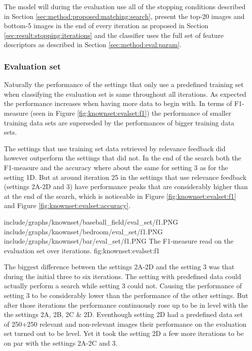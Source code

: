 The model will during the evaluation use all of the stopping conditions described in Section \ref{sec:method:proposed:matching:search}, present the top-20 images and bottom-5 images in the end of every iteration as proposed in Section \ref{sec:result:stopping:iterations} and the classifier uses the full set of feature descriptors as described in Section \ref{sec:method:eval:param}. 

\subsubsection{Evaluation set}
\label{sec:res:knownset:eval}
Naturally the performance of the settings that only use a predefined training set when classifying the evaluation set is same throughout all iterations. As expected the performance increases when having more data to begin with. In terms of F1-measure (seen in Figure \ref{fig:knownset:evalset:f1}) the performance of smaller training data sets are superseded by the performances of bigger training data sets. 


The settings that use training set data retrieved by relevance feedback did however outperform the settings that did not. In the end of the search both the F1-measure and the accuracy where about the same for setting 3 as for the setting 1D. But at around iteration 25 in the settings that use relevance feedback (settings 2A-2D and 3) have performance peaks that are considerably higher than at the end of the search, which is noticeable in Figure \ref{fig:knownset:evalset:f1} and Figure \ref{fig:knownset:evalset:accuracy}.

\tripfigurenear
{include/graphs/knownset/baseball_field/eval_set/f1.PNG}
{include/graphs/knownset/bedroom/eval_set/f1.PNG}
{include/graphs/knownset/bar/eval_set/f1.PNG}
{The F1-measure read on the evaluation set over iterations.}
{fig:knownset:evalset:f1}

The biggest difference between the settings 2A-2D and the setting 3 was that during the initial three to six iterations. The setting with predefined data could actually perform a search while setting 3 could not. Causing the performance of setting 3 to be considerably lower than the performance of the other settings. But after those iterations the performance continuously rose up to be in level with the the settings 2A, 2B, 2C \& 2D. Eventhough setting 2D had a predefined data set of 250+250 relevant and non-relevant images their performance on the evaluation set turned out to be level. Yet it took the setting 2D a few more iterations to be on par with the settings 2A-2C and 3.

